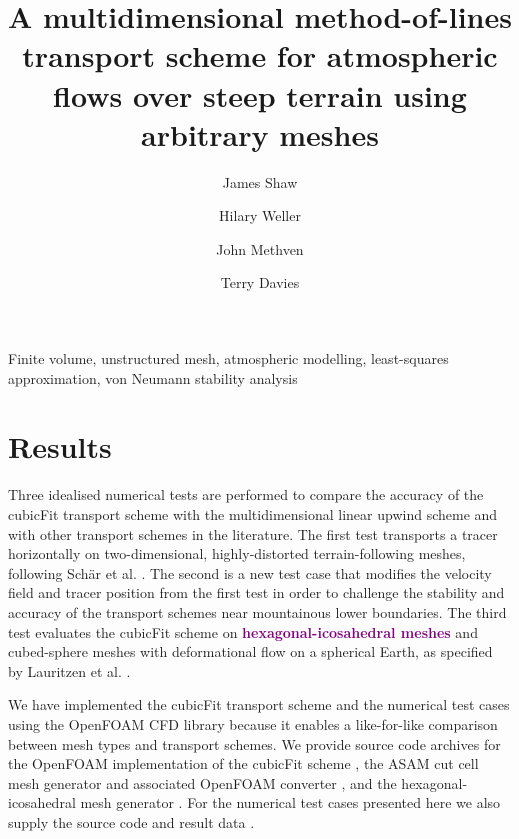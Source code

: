 \documentclass[times]{elsarticle}
\newcommand{\revone}[1]{\textcolor{purple}{\textbf{#1}}}
\begin{document}
\begin{frontmatter}
\title{A multidimensional method-of-lines transport scheme for atmospheric flows over steep terrain using arbitrary meshes}
\author[uor]{James Shaw}
\author[uor]{Hilary Weller}
\author[uor]{John Methven}
\author[mo]{Terry Davies}

\address[uor]{Department of Meteorology, University of Reading, Reading, United Kingdom}
\address[mo]{Met Office, Exeter, United Kingdom}



\begin{keyword}
	Finite volume, unstructured mesh, atmospheric modelling, least-squares approximation, von Neumann stability analysis
\end{keyword}
\end{frontmatter}





\section{Results}
\label{sec:results}

Three idealised numerical tests are performed to compare the accuracy of the cubicFit transport scheme with the multidimensional linear upwind scheme and with other transport schemes in the literature.  The first test transports a tracer horizontally on two-dimensional, highly-distorted terrain-following meshes, following Sch\"{a}r et al. \citep{schaer2002}.
The second is a new test case that modifies the velocity field and tracer position from the first test in order to challenge the stability and accuracy of the transport schemes near mountainous lower boundaries.
The third test evaluates the cubicFit scheme on \revone{hexagonal-icosahedral meshes} and cubed-sphere meshes with deformational flow on a spherical Earth, as specified by Lauritzen et al. \citep{lauritzen2012}.

We have implemented the cubicFit transport scheme and the numerical test cases using the OpenFOAM CFD library because it enables a like-for-like comparison between mesh types and transport schemes.  We provide source code archives for the OpenFOAM implementation of the cubicFit scheme \citep{atmosfoam}, the ASAM cut cell mesh generator \citep{asam_grid} and associated OpenFOAM converter \citep{gmv2openfoam}, and the hexagonal-icosahedral mesh generator \citep{geodesic-mesh}.  For the numerical test cases presented here we also supply the source code \citep{atmostests} and result data \citep{atmostests-data}.
\end{document}
